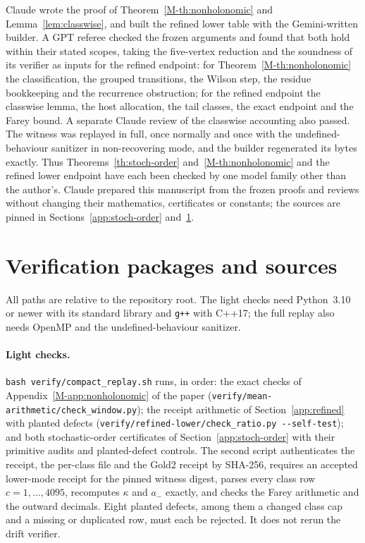 \documentclass[11pt]{article}
\newcommand{\sectag}[1]{\renewcommand{\thesection}{#1}\renewcommand{\theHsection}{#1}}
\theoremstyle{remark}
\numberwithin{equation}{section}
\begin{document}
Claude wrote the proof of Theorem~\ref{M-th:nonholonomic} and Lemma~\ref{lem:classwise}, and built the refined lower table with the Gemini-written builder. A GPT referee checked the frozen arguments and found that both hold within their stated scopes, taking the five-vertex reduction and the soundness of its verifier as inputs for the refined endpoint: for Theorem~\ref{M-th:nonholonomic} the classification, the grouped transitions, the Wilson step, the residue bookkeeping and the recurrence obstruction; for the refined endpoint the classwise lemma, the host allocation, the tail classes, the exact endpoint and the Farey bound. A separate Claude review of the classwise accounting also passed. The witness was replayed in full, once normally and once with the undefined-behaviour sanitizer in non-recovering mode, and the builder regenerated its bytes exactly. Thus Theorems~\ref{th:stoch-order} and~\ref{M-th:nonholonomic} and the refined lower endpoint have each been checked by one model family other than the author's. Claude prepared this manuscript from the frozen proofs and reviews without changing their mathematics, certificates or constants; the sources are pinned in Sections~\ref{app:stoch-order} and~\ref{app:replay}.

\sectag{VER}
\section{Verification packages and sources}\label{app:replay}\label{sec:replay}
All paths are relative to the repository root. The light checks need Python~3.10 or newer with its standard library and \texttt{g++} with C++17; the full replay also needs OpenMP and the undefined-behaviour sanitizer.

\paragraph{Light checks.} \texttt{bash verify/compact\_replay.sh} runs, in order: the exact checks of Appendix~\ref{M-app:nonholonomic} of the paper (\texttt{verify/mean-arithmetic/check\_window.py}); the receipt arithmetic of Section~\ref{app:refined} with planted defects (\texttt{verify/refined-lower/check\_ratio.py -{}-self-test}); and both stochastic-order certificates of Section~\ref{app:stoch-order} with their primitive audits and planted-defect controls. The second script authenticates the receipt, the per-class file and the Gold2 receipt by SHA-256, requires an accepted lower-mode receipt for the pinned witness digest, parses every class row $c=1,\dots,4095$, recomputes $\kappa$ and $a_-$ exactly, and checks the Farey arithmetic and the outward decimals. Eight planted defects, among them a changed class cap and a missing or duplicated row, must each be rejected. It does not rerun the drift verifier.
\end{document}
